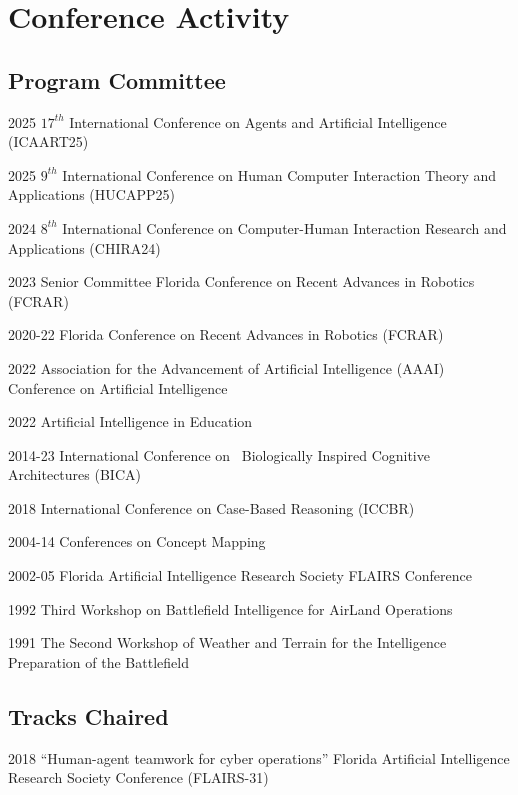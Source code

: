\documentclass[12pt,letterpaper]{report}
\begin{document}
    \section*{Conference Activity}

    \subsection*{Program Committee}
    \begin{tablist}
        \item[2025] \tab{}$17^{th}$ International Conference on Agents and Artificial Intelligence (ICAART25)
        \item[2025] \tab{}$9^{th}$ International Conference on Human Computer Interaction Theory and Applications (HUCAPP25)
        \item[2024] \tab{}$8^{th}$ International Conference on Computer-Human Interaction Research and Applications (CHIRA24)
        \item[2023] \tab{}Senior Committee Florida Conference on Recent Advances in Robotics (FCRAR)
        \item[2020-22] \tab{}Florida Conference on Recent Advances in Robotics (FCRAR)
        \item[2022] \tab{}Association for the Advancement of Artificial Intelligence (AAAI) Conference on Artificial Intelligence
        \item[2022] \tab{}Artificial Intelligence in Education
        \item[2014-23] \tab{}International Conference on  Biologically Inspired Cognitive Architectures (BICA)
        \item[2018] \tab{}International Conference on Case-Based Reasoning (ICCBR)
        \item[2004-14] \tab{}Conferences on Concept Mapping 
        \item[2002-05] \tab{}Florida Artificial Intelligence Research Society FLAIRS Conference
        \item[1992] \tab{}Third Workshop on Battlefield Intelligence for AirLand Operations
        \item[1991] \tab{}The Second Workshop of Weather and Terrain for the Intelligence Preparation of the Battlefield
    \end{tablist}

    \subsection*{Tracks Chaired}
    \begin{tablist}
        \item[2018] \tab{}\enquote{Human-agent teamwork for cyber operations} Florida Artificial Intelligence Research Society Conference (FLAIRS-31)
    \end{tablist}
\end{document}
